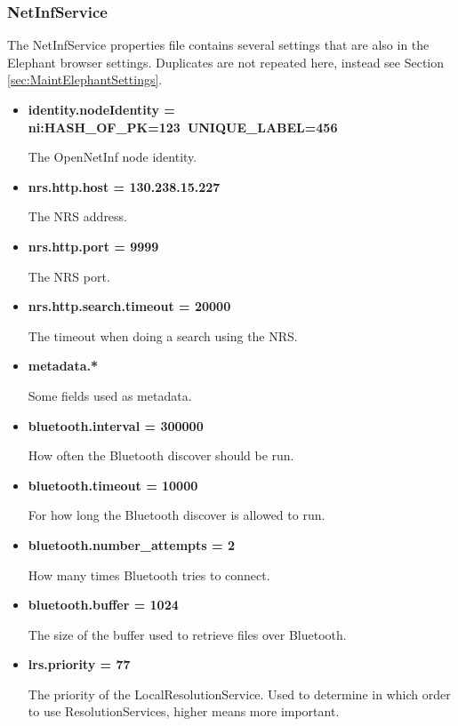 \subsubsection{NetInfService}

The NetInfService properties file contains several settings that are also in the Elephant browser settings. Duplicates are not repeated here, instead see Section \ref{sec:MaintElephantSettings}.

\begin{itemize}
	\item {\bf identity.nodeIdentity = ni:HASH\_OF\_PK=123~UNIQUE\_LABEL=456}
	
	The OpenNetInf node identity.
	
	\item {\bf nrs.http.host = 130.238.15.227}
	
	The NRS address.
	
	\item {\bf nrs.http.port = 9999}	
	
	The NRS port.
	
	\item {\bf nrs.http.search.timeout = 20000}	
	
	The timeout when doing a search using the NRS.
	
	\item {\bf metadata.*}
	
	Some fields used as metadata.
	
	\item{\bf bluetooth.interval = 300000}
	
	How often the Bluetooth discover should be run.
	
	\item{\bf bluetooth.timeout = 10000}
	
	For how long the Bluetooth discover is allowed to run.
	
	\item{\bf bluetooth.number\_attempts = 2}
	
	How many times Bluetooth tries to connect.
	
	\item{\bf bluetooth.buffer = 1024}
	
	The size of the buffer used to retrieve files over Bluetooth.
	
	\item{\bf lrs.priority = 77}
	
	The priority of the LocalResolutionService. Used to determine in which order to use ResolutionServices, higher means more important.
	

\end{itemize}
